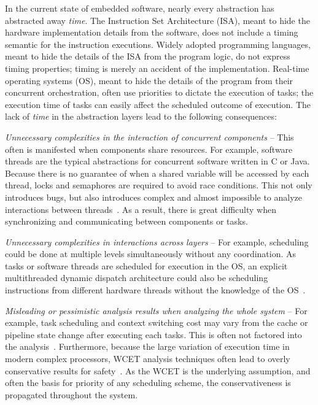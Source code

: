 In the current state of embedded software, nearly every abstraction has abstracted away \emph{time}.
The Instruction Set Architecture (ISA), meant to hide the hardware implementation details from the software, does not include a timing semantic for the instruction executions.  
Widely adopted programming languages, meant to hide the details of the ISA from the program logic, do not express timing properties; timing is merely an accident of the implementation.
Real-time operating systems (OS), meant to hide the details of the program from their concurrent orchestration, often use priorities to dictate the execution of tasks; the execution time of tasks can easily affect the scheduled outcome of execution.
The lack of \emph{time} in the abstraction layers lead to the following consequences:
\begin{list}{*}{}
\item \emph{Unnecessary complexities in the interaction of concurrent components} --  
This often is manifested when components share resources. 
For example, software threads are the typical abstractions for concurrent software written in C or Java. 
Because there is no guarantee of when a shared variable will be accessed by each thread, locks and semaphores are required to avoid race conditions. 
This not only introduces bugs, but also introduces complex and almost impossible to analyze interactions between threads~\cite{Lee2006threads}. 
As a result, there is great difficulty when synchronizing and communicating between components or tasks.

\item \emph{Unnecessary complexities in interactions across layers} -- 
For example, scheduling could be done at multiple levels simultaneously without any coordination. 
As tasks or software threads are scheduled for execution in the OS, an explicit multithreaded dynamic dispatch architecture could also be scheduling instructions from different hardware threads without the knowledge of the OS~\cite{thiele_et_al:DSP:2004:2}.

\item \emph{Misleading or pessimistic analysis results when analyzing the whole system} -- 
For example, task scheduling and context switching cost may vary from the cache or pipeline state change after executing each tasks. 
This is often not factored into the analysis~\cite{thiele_et_al:DSP:2004:2}. 
Furthermore, because the  large variation of execution time in modern complex processors, WCET analysis techniques often lead to overly conservative results for safety~\cite{Wilhelm2008survey}. 
As the WCET is the underlying  assumption, and often the basis for priority of any scheduling scheme, the conservativeness is propagated throughout the system.
\end{list}

